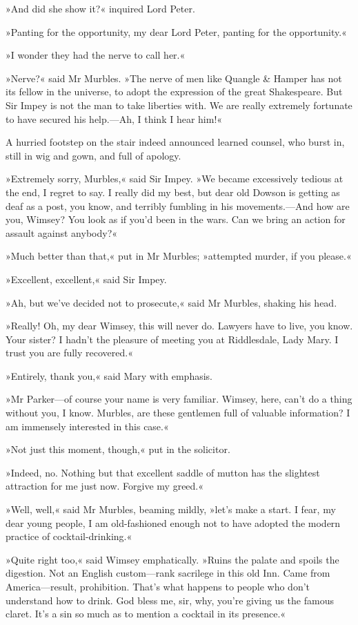 »And did she show it?« inquired Lord Peter.

»Panting for the opportunity, my dear Lord Peter, panting for the opportunity.«

»I wonder they had the nerve to call her.«

»Nerve?« said Mr Murbles. »The nerve of men like Quangle \& Hamper has not its fellow in the universe, to adopt the expression of the great Shakespeare. But Sir Impey is not the man to take liberties with. We are really extremely fortunate to have secured his help.—Ah, I think I hear him!«

A hurried footstep on the stair indeed announced learned counsel, who burst in, still in wig and gown, and full of apology.

»Extremely sorry, Murbles,« said Sir Impey. »We became excessively tedious at the end, I regret to say. I really did my best, but dear old Dowson is getting as deaf as a post, you know, and terribly fumbling in his movements.—And how are you, Wimsey? You look as if you'd been in the wars. Can we bring an action for assault against anybody?«

»Much better than that,« put in Mr Murbles; »attempted murder, if you please.«

»Excellent, excellent,« said Sir Impey.

»Ah, but we've decided not to prosecute,« said Mr Murbles, shaking his head.

»Really! Oh, my dear Wimsey, this will never do. Lawyers have to live, you know. Your sister? I hadn't the pleasure of meeting you at Riddlesdale, Lady Mary. I trust you are fully recovered.«

»Entirely, thank you,« said Mary with emphasis.

»Mr Parker—of course your name is very familiar. Wimsey, here, can't do a thing without you, I know. Murbles, are these gentlemen full of valuable information? I am immensely interested in this case.«

»Not just this moment, though,« put in the solicitor.

»Indeed, no. Nothing but that excellent saddle of mutton has the slightest attraction for me just now. Forgive my greed.«

»Well, well,« said Mr Murbles, beaming mildly, »let's make a start.  I fear, my dear young people, I am old-fashioned enough not to have adopted the modern practice of cocktail-drinking.«

»Quite right too,« said Wimsey emphatically. »Ruins the palate and spoils the digestion. Not an English custom—rank sacrilege in this old Inn. Came from America—result, prohibition. That's what happens to people who don't understand how to drink. God bless me, sir, why, you're giving us the famous claret. It's a sin so much as to mention a cocktail in its presence.«

